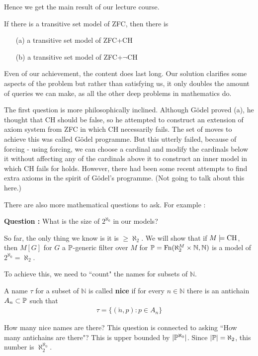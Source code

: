 \documentclass[12pt,a4paper]{article}
\begin{document}
Hence we get the main result of our lecture course.
\s

\corr If there is a transitive set model of ZFC, then there is
\begin{itemize}
\item[(a)] a transitive set model of ZFC+CH
\item[(b)] a transitive set model of ZFC+$\neg$CH
\end{itemize}
\s

Even of our achievement, the content does last long. Our solution clarifies some aspects of the problem but rather than satisfying us, it only doubles the amount of queries we can make, as all the other deep problems in mathematics do. 
\s

The first question is more philosophically inclined. Although G\"odel proved (a), he thought that CH should be false, so he attempted to construct an extension of axiom system from ZFC in which CH necessarily fails. The set of moves to achieve this was called G\"odel programme. But this utterly failed, because of forcing - using forcing, we can choose a cardinal and modify the cardinals below it without affecting any of the cardinals above it to construct an inner model in which CH fails for holds. However, there had been some recent attempts to find extra axioms in the spirit of G\"odel's programme. (Not going to talk about this here.)
\s

There are also more mathematical questions to ask. For example :
\s

\textbf{Question :} What is the size of $2^{\aleph_0}$ in our models?

\quad So far, the only thing we know is it is $\geq \aleph_2$. We will show that if $M\models \text{CH}$, then $M[G]$ for $G$ a $\mathbb{P}$-generic filter over $M$ for $\mathbb{P} = \text{Fn}(\aleph_2^M \times \mathbb{N}, \mathbb{N})$ is a model of $2^{\aleph_0} = \aleph_2$.

\quad To achieve this, we need to ``count" the names for subsets of $\mathbb{N}$.
\s

 A name $\tau$ for a subset of $\mathbb{N}$ is called \textbf{nice} if for every $n\in \mathbb{N}$ there is an antichain $A_n \subset \mathbb{P}$ such that
\begin{align*}
\tau = \{(\check{n}, p) : p\in A_n \}
\end{align*}
\s

How many nice names are there? This question is connected to asking ``How many antichains are there"? This is upper bounded by $|\mathbb{P}^{\aleph_0}|$. Since $|\mathbb{P}| = \aleph_2$, this number is $\aleph_2^{\aleph_0}$.
\end{document}
